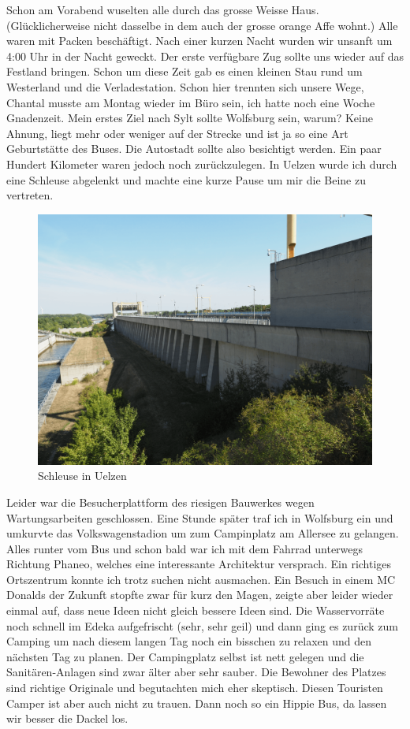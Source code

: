 Schon am Vorabend wuselten alle durch das grosse Weisse Haus.
(Glücklicherweise nicht dasselbe in dem auch der grosse orange Affe wohnt.)
Alle waren mit Packen beschäftigt.
Nach einer kurzen Nacht wurden wir unsanft um 4:00 Uhr in der Nacht geweckt.
Der erste verfügbare Zug sollte uns wieder auf das Festland bringen.
Schon um diese Zeit gab es einen kleinen Stau rund um Westerland und die Verladestation.
Schon hier trennten sich unsere Wege, Chantal musste am Montag wieder im Büro sein, ich hatte noch eine Woche Gnadenzeit.
Mein erstes Ziel nach Sylt sollte Wolfsburg sein, warum?
Keine Ahnung, liegt mehr oder weniger auf der Strecke und ist ja so eine Art Geburtstätte des Buses.
Die Autostadt sollte also besichtigt werden.
Ein paar Hundert Kilometer waren jedoch noch zurückzulegen.
In Uelzen wurde ich durch eine Schleuse abgelenkt und machte eine kurze Pause um mir die Beine zu vertreten.

\begin{figure}[h]
    \centering
    \includegraphics[width=\textwidth]{../Bilder/Sylt/45.png}
    \caption{Schleuse in Uelzen}
    \label{img:Schleuse in Uelzen}
\end{figure}

Leider war die Besucherplattform des riesigen Bauwerkes wegen Wartungsarbeiten geschlossen. 
Eine Stunde später traf ich in Wolfsburg ein und umkurvte das Volkswagenstadion um zum Campinplatz am Allersee zu gelangen.
Alles runter vom Bus und schon bald war ich mit dem Fahrrad unterwegs Richtung Phaneo, welches eine interessante Architektur versprach.
Ein richtiges Ortszentrum konnte ich trotz suchen nicht ausmachen.
Ein Besuch in einem MC Donalds der Zukunft stopfte zwar für kurz den Magen, zeigte aber leider wieder einmal auf, dass neue Ideen nicht gleich bessere Ideen sind.
Die Wasservorräte noch schnell im Edeka aufgefrischt (sehr, sehr geil) und dann ging es zurück zum Camping um nach diesem langen Tag noch ein bisschen zu relaxen und den nächsten Tag zu planen.
Der Campingplatz selbst ist nett gelegen und die Sanitären-Anlagen sind zwar älter aber sehr sauber.
Die \glqq Bewohner\grqq{} des Platzes sind richtige Originale und begutachten mich eher skeptisch. 
Diesen Touristen Camper ist aber auch nicht zu trauen.
Dann noch so ein Hippie Bus, da lassen wir besser die Dackel los.

